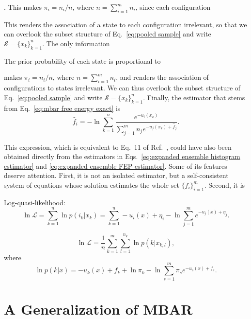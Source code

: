 \documentclass[aip,jcp,preprint,amsmath,amssymb]{revtex4-1}
\begin{document}
. This makes $\pi_i = n_i/n$, where $n = \sum_{i=1}^m n_i$, since each configuration 



This renders the association of a state to each configuration irrelevant, so that we can overlook the subset structure of Eq.~\eqref{eq:pooled sample} and write $\mathcal S = \{x_k\}_{k=1}^n$. The only information 

The prior probability of each state is proportional to 

makes $\pi_i = n_i/n$, where $n = \sum_{i=1}^m n_i$, and renders the association of configurations to states irrelevant. We can thus overlook the subset structure of Eq.~\eqref{eq:pooled sample} and write $\mathcal S = \{x_k\}_{k=1}^n$. Finally, the estimator that stems from Eq.~\eqref{eq:mbar free energy exact} is
\begin{equation}
\label{eq:mbar free energy estimator}
\hat f_i = -\ln \sum_{k=1}^n \frac{e^{-u_i(x_k)}}{\sum_{j=1}^m n_j e^{-u_j(x_k) + \hat f_j}}.
\end{equation}

This expression, which is equivalent to Eq.~11 of Ref.~, could have also been obtained directly from the estimators in Eqs.~\eqref{eq:expanded ensemble histogram estimator} and \eqref{eq:expanded ensemble FEP estimator}. Some of its features deserve attention. First, it is not an isolated estimator, but a self-consistent system of equations whose solution estimates the whole set $\{f_i\}_{i=1}^m$. Second, it is 

Log-quasi-likelihood:\cite{Geyer_1994}
\begin{equation*}
\ln \mathcal L = \sum_{k=1}^n \ln p(i_k|x_k) = \sum_{k=1}^n -u_i(x) + \eta_i - \ln \sum_{j=1}^m e^{-u_j(x) + \eta_j}.
\end{equation*}

\begin{equation}
\label{eq:mbar log quasi-likelihood}
\ln \mathcal L = \frac{1}{n} \sum_{k=1}^m \sum_{l=1}^{n_k} \ln p(k|x_{k,l}),
\end{equation}
where
\begin{equation*}
\ln p(k|x) = -u_k(x) + f_k + \ln \pi_k - \ln \sum_{s=1}^m \pi_s e^{-u_s(x) + f_s}.
\end{equation*}


\section{A Generalization of MBAR}
\end{document}

